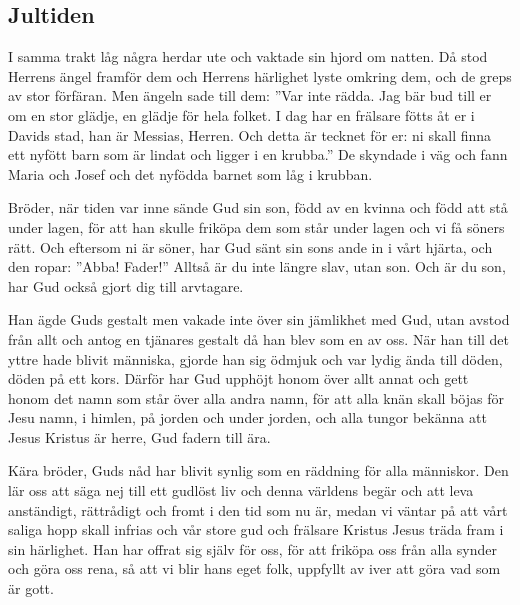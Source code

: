 \subsection{Jultiden}



 I samma trakt låg några herdar ute och vaktade sin hjord om natten. 
 Då stod Herrens ängel framför dem och Herrens härlighet lyste omkring dem, och de greps av stor förfäran. 
 Men ängeln sade till dem: ”Var inte rädda. Jag bär bud till er om en stor glädje, en glädje för hela folket. 
 I dag har en frälsare fötts åt er i Davids stad, han är Messias, Herren. 
 Och detta är tecknet för er: ni skall finna ett nyfött barn som är lindat och ligger i en krubba.” 
 De skyndade i väg och fann Maria och Josef och det nyfödda barnet som låg i krubban.


 Bröder, när tiden var inne sände Gud sin son, född av en kvinna och född att stå under lagen, 
 för att han skulle friköpa dem som står under lagen och vi få söners rätt. 
 Och eftersom ni är söner, har Gud sänt sin sons ande in i vårt hjärta, och den ropar: ”Abba! Fader!” 
 Alltså är du inte längre slav, utan son. Och är du son, har Gud också gjort dig till arvtagare.



 Han ägde Guds gestalt men vakade inte över sin jämlikhet med Gud, 
 utan avstod från allt och antog en tjänares gestalt då han blev som en av oss. När han till det yttre hade blivit människa, 
 gjorde han sig ödmjuk och var lydig ända till döden, döden på ett kors. 
 Därför har Gud upphöjt honom över allt annat och gett honom det namn som står över alla andra namn, 
 för att alla knän skall böjas för Jesu namn, i himlen, på jorden och under jorden, 
 och alla tungor bekänna att Jesus Kristus är herre, Gud fadern till ära.





 Kära bröder, Guds nåd har blivit synlig som en räddning för alla människor. 
 Den lär oss att säga nej till ett gudlöst liv och denna världens begär och att leva anständigt, rättrådigt och fromt i den tid som nu är, 
 medan vi väntar på att vårt saliga hopp skall infrias och vår store gud och frälsare Kristus Jesus träda fram i sin härlighet. 
 Han har offrat sig själv för oss, för att friköpa oss från alla synder och göra oss rena, så att vi blir hans eget folk, uppfyllt av iver att göra vad som är gott.




